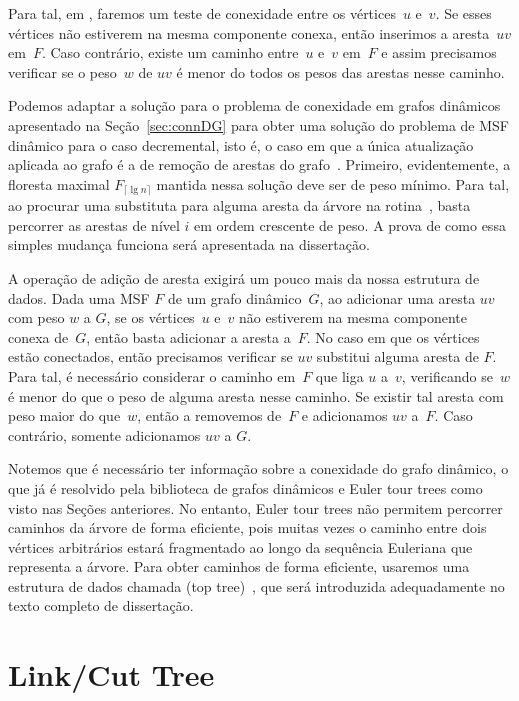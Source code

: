 Para tal, em \MSFaddEdge, faremos um teste de conexidade entre os vértices~$u$ e~$v$.
Se esses vértices não estiverem na mesma componente conexa, então inserimos a aresta~$uv$ em~$F$.
Caso contrário, existe um caminho entre~$u$ e~$v$ em~$F$ e assim precisamos verificar se o peso~$w$ de $uv$ é menor do todos os
pesos das arestas nesse caminho.

Podemos adaptar a solução para o problema de conexidade em grafos dinâmicos apresentado na Seção~\ref{sec:connDG} para obter uma solução do problema de MSF dinâmico para o caso decremental, isto é, o caso em que a única atualização aplicada ao grafo é a de remoção de arestas do grafo~\cite{poly_log}. Primeiro, evidentemente, a floresta maximal $F_{\lceil \lg n \rceil}$ mantida nessa solução deve ser de peso mínimo. Para tal, ao procurar uma substituta para alguma aresta da árvore na rotina~\dymGraphReplace{}, basta percorrer as arestas de nível $i$ em ordem crescente de peso. A prova de como essa simples mudança funciona será apresentada na dissertação.

A operação de adição de aresta exigirá um pouco mais da nossa estrutura de dados. Dada uma MSF $F$ de um grafo dinâmico~$G$, ao adicionar uma aresta $uv$ com peso $w$ a $G$, se os vértices~$u$ e~$v$ não estiverem na mesma componente conexa de~$G$, então basta adicionar a aresta a~$F$. No caso em que os vértices estão conectados, então precisamos verificar se $uv$ substitui alguma aresta de $F$. Para tal, é necessário considerar o caminho em~$F$ que liga $u$ a~$v$, verificando se~$w$ é menor do que o peso de alguma aresta nesse caminho. Se existir tal aresta com peso maior do que~$w$, então a removemos de~$F$ e adicionamos $uv$ a~$F$. Caso contrário, somente adicionamos $uv$ a $G$.

Notemos que é necessário ter informação sobre a conexidade do grafo dinâmico, o que já é resolvido pela biblioteca de grafos dinâmicos e Euler tour trees como visto nas Seções anteriores. No entanto, Euler tour trees não permitem percorrer caminhos da árvore de forma eficiente, pois muitas vezes o caminho entre dois vértices arbitrários estará fragmentado ao longo da sequência Euleriana que representa a árvore. Para obter caminhos de forma eficiente, usaremos uma estrutura de dados chamada  (top tree)~\cite{AHLTMinDiameter}, que será introduzida adequadamente no texto completo de dissertação.


\section{Link/Cut Tree}

